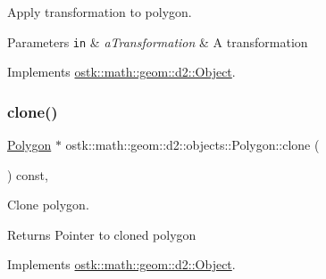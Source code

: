 Apply transformation to polygon. 


\begin{DoxyParams}[1]{Parameters}
\mbox{\tt in}  & {\em a\+Transformation} & A transformation \\
\hline
\end{DoxyParams}


Implements \hyperlink{classostk_1_1math_1_1geom_1_1d2_1_1_object_a959e50211d7a680f7f904bbb752d75c9}{ostk\+::math\+::geom\+::d2\+::\+Object}.

\mbox{\label{classostk_1_1math_1_1geom_1_1d2_1_1objects_1_1_polygon_a55e4524d1f58bf8379580e63f49f0b48}} 
\subsubsection{\texorpdfstring{clone()}{clone()}}
{\footnotesize\ttfamily \hyperlink{classostk_1_1math_1_1geom_1_1d2_1_1objects_1_1_polygon}{Polygon} $\ast$ ostk\+::math\+::geom\+::d2\+::objects\+::\+Polygon\+::clone (\begin{DoxyParamCaption}{ }\end{DoxyParamCaption}) const\hspace{0.3cm}{\ttfamily [override]}, {\ttfamily [virtual]}}



Clone polygon. 

\begin{DoxyReturn}{Returns}
Pointer to cloned polygon 
\end{DoxyReturn}


Implements \hyperlink{classostk_1_1math_1_1geom_1_1d2_1_1_object_a98dedc6792aef35308966ca768eb3e14}{ostk\+::math\+::geom\+::d2\+::\+Object}.

\mbox{\label{classostk_1_1math_1_1geom_1_1d2_1_1objects_1_1_polygon_aa9f49a046d832821a8b26064b3cf2158}} 
